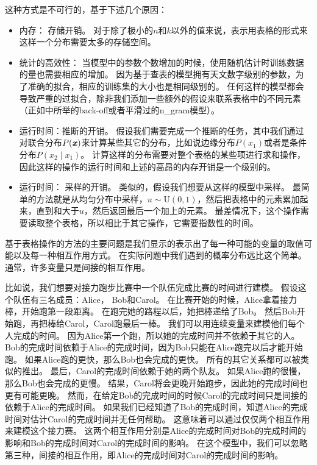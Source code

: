 这种方式是不可行的，基于下述几个原因：
\begin{itemize}
	\item 内存： 存储开销。
	对于除了极小的$n$和$k$以外的值来说，表示用表格的形式来这样一个分布需要太多的存储空间。
	
	
	\item  统计的高效性： 当模型中的参数个数增加的时候，使用随机估计时训练数据的量也需要相应的增加。
	因为基于查表的模型拥有天文数字级别的参数，为了准确的拟合，相应的训练集的大小也是相同级别的。
	任何这样的模型都会导致严重的过拟合，除非我们添加一些额外的假设来联系表格中的不同元素（正如中所举的back-off或者平滑过的\gls{n_gram}模型）。
	
	\item 运行时间：推断的开销。
	假设我们需要完成一个推断的任务，其中我们通过对联合分布$P(\boldsymbol{\mathit{x}})$来计算某些其它的分布，比如说边缘分布$P(x_1)$或者是条件分布$P(x_2\mid x_1)$。
	计算这样的分布需要对整个表格的某些项进行求和操作，因此这样的操作的运行时间和上述的高昂的内存开销是一个级别的。
	
	
	\item 运行时间： 采样的开销。
	类似的，假设我们想要从这样的模型中采样。
	最简单的方法就是从均匀分布中采样，$u\sim \text{U}(0,1)$，然后把表格中的元素累加起来，直到和大于$u$，然后返回最后一个加上的元素。
	最差情况下，这个操作需要读取整个表格，所以相比于其它操作，它需要指数性的时间。
\end{itemize}



基于表格操作的方法的主要问题是我们显示的表示出了每一种可能的变量的取值可能以及每一种相互作用方式。
在实际问题中我们遇到的概率分布远比这个简单。
通常，许多变量只是间接的相互作用。


比如说，我们想要对接力跑步比赛中一个队伍完成比赛的时间进行建模。
假设这个队伍有三名成员：Alice， Bob和Carol。
在比赛开始的时候，Alice拿着接力棒，开始跑第一段距离。
在跑完她的路程以后，她把棒递给了Bob。
然后Bob开始跑，再把棒给Carol，Carol跑最后一棒。
我们可以用连续变量来建模他们每个人完成的时间。
因为Alice第一个跑，所以她的完成时间并不依赖于其它的人。
Bob的完成时间依赖于Alice的完成时间，因为Bob只能在Alice跑完以后才能开始跑。
如果Alice跑的更快，那么Bob也会完成的更快。
所有的其它关系都可以被类似的推出。
最后，Carol的完成时间依赖于她的两个队友。
如果Alice跑的很慢，那么Bob也会完成的更慢。
结果，Carol将会更晚开始跑步，因此她的完成时间也更有可能更晚。
然而，在给定Bob的完成时间的时候Carol的完成时间只是间接的依赖于Alice的完成时间。
如果我们已经知道了Bob的完成时间，知道Alice的完成时间对估计Carol的完成时间并无任何帮助。
这意味着可以通过仅仅两个相互作用来建模这个接力赛。
这两个相互作用分别是Alice的完成时间对Bob的完成时间的影响和Bob的完成时间对Carol的完成时间的影响。
在这个模型中，我们可以忽略第三种，间接的相互作用，即Alice的完成时间对Carol的完成时间的影响。


